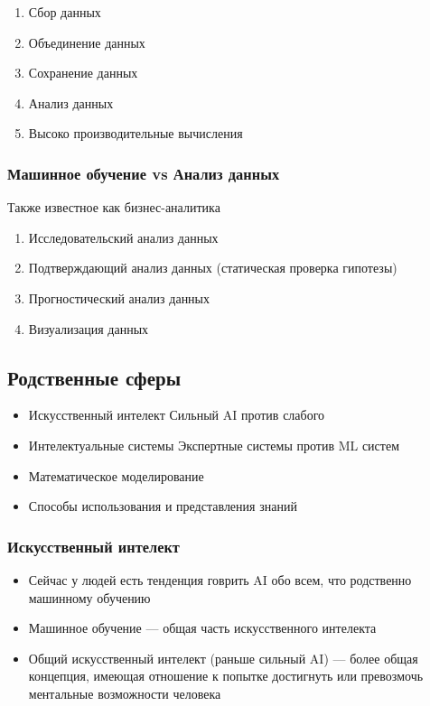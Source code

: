 \documentclass[10pt,a4paper,oneside,titlepage]{report}
\theoremstyle{defenition}
\theoremstyle{theorem}
\begin{document}
\begin{enumerate}
	\item Сбор данных
	\item Объединение данных
	\item Сохранение данных
	\item Анализ данных
	\item Высоко производительные вычисления
\end{enumerate}

\subsubsection{Машинное обучение vs Анализ данных}

Также известное как бизнес-аналитика

\begin{enumerate}
	\item Исследовательский анализ данных
	\item Подтверждающий анализ данных (статическая проверка гипотезы)
	\item Прогностический анализ данных
	\item Визуализация данных
\end{enumerate}

\subsection{Родственные сферы}

\begin{itemize}
	\item Искусственный интелект
	Сильный AI против слабого
	\item Интелектуальные системы
	Экспертные системы против ML систем
	\item Математическое моделирование
	\item Способы использования и представления знаний
\end{itemize}

\subsubsection{Искусственный интелект}

\begin{itemize}
	\item Сейчас у людей есть тенденция говрить AI обо всем, что родственно машинному обучению
	\item Машинное обучение --- общая часть искусственного интелекта
	\item Общий искусственный интелект (раньше сильный AI) --- более общая концепция, имеющая отношение к попытке достигнуть или превозмочь ментальные возможности человека
\end{itemize}
\end{document}
